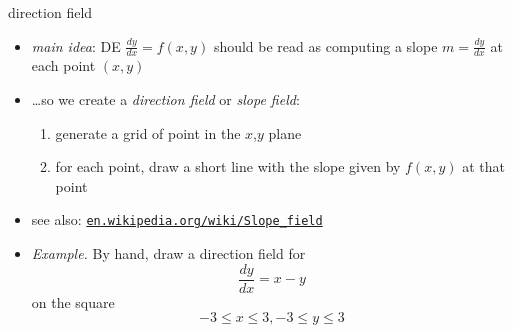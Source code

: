\documentclass{beamer}
\begin{document}
\begin{frame}{direction field}

\begin{itemize}
\item \emph{main idea}: DE $\frac{dy}{dx} = f(x,y)$ should be read as computing a slope $m=\frac{dy}{dx}$ at each  point $(x,y)$
\item \dots so we create a \emph{direction field} or \emph{slope field}:
    \begin{enumerate}
    \item generate a grid of point in the $x$,$y$ plane
    \item for each point, draw a short line with the slope given by $f(x,y)$ at that point
    \end{enumerate}
\item see also: \small \href{https://en.wikipedia.org/wiki/Slope_field}{\color{blue} \texttt{en.wikipedia.org/wiki/Slope\_field}} \normalsize

\bigskip
\item \begin{minipage}[t]{0.375\textwidth}
\emph{Example.}  By hand, draw a direction field for
$$\frac{dy}{dx} = x-y$$
on the square
$$-3 \le x \le 3, -3 \le y \le 3$$
\end{minipage} 

\vspace{20mm}
\end{itemize}
\end{frame}
\end{document}
